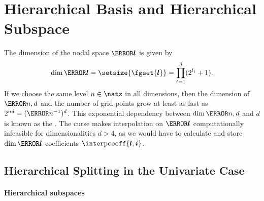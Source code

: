 \section{Hierarchical Basis and Hierarchical Subspace}
\label{sec:22hierSubspaces}

The dimension of the nodal space $\ns{\*l}$ is given by
\begin{equation}
  \label{eq:dimensionFG}
  \dim \ns{\*l}
  = \setsize{\fgset{\*l}}
  = \prod_{t=1}^d (2^{l_t} + 1).
\end{equation}
If we choose the same level $n \in \natz$ in all dimensions,
then the dimension of $\ns{n,d}$ and the
number of grid points grow at least as fast as
$2^{nd} = (\ms{n}^{-1})^d$.
This exponential dependency between $\dim \ns{n,d}$ and $d$ is known as the
.
The curse makes interpolation on $\ns{\*l}$ computationally infeasible
for dimensionalities $d > 4$,
as we would have to calculate and store $\dim \ns{\*l}$ coefficients $\interpcoeff{\*l,\*i}$.%



\subsection{Hierarchical Splitting in the Univariate Case}
\label{sec:221hierUV}

\paragraph{Hierarchical subspaces}

